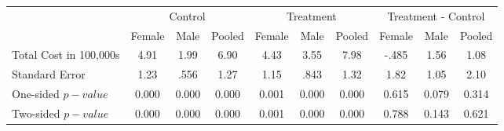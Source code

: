 \begin{tabular}{lccccccccc} \hline \hline
 & \multicolumn{3}{c}{Control} & \multicolumn{3}{c}{Treatment} & \multicolumn{3}{c}{Treatment - Control} \\ 
 & Female  & Male  & Pooled  & Female  & Male  & Pooled  & Female  & Male  & Pooled  \\  \hline 
Total Cost in 100,000s &  4.91  &  1.99  &  6.90  &  4.43  &  3.55  &  7.98  & -.485 &  1.56  &  1.08  \\  
Standard Error &  1.23  & .556 &  1.27  &  1.15  & .843 &  1.32  &  1.82  &  1.05  &  2.10  \\  
One-sided $p-value$ &     0.000 &     0.000 &     0.000 &     0.001 &     0.000 &     0.000 &     0.615 &     0.079 &     0.314 \\  
Two-sided $p-value$ &     0.000 &     0.000 &     0.000 &     0.001 &     0.000 &     0.000 &     0.788 &     0.143 &     0.621 \\  
\hline \hline \end{tabular}